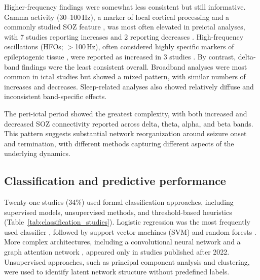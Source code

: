 \documentclass[12pt]{article}
\begin{document}
Higher-frequency findings were somewhat less consistent but still informative. Gamma activity (30--100\,Hz), a marker of local cortical processing and a commonly studied SOZ feature \cite{Grinenko2018-zk}, was most often elevated in preictal analyses, with 7 studies reporting increases \cite{Coelli2019-hu, Li2021-gq, Vila-Vidal2024-ha, Ivankovic2025-ng, Li2025-os, Xu2025-lh, He2025-tw} and 2 reporting decreases \cite{Van_Diessen2013-pr, Vila-Vidal2024-ha}. High-frequency oscillations (HFOs; $>$100\,Hz), often considered highly specific markers of epileptogenic tissue \cite{Jacobs2012-uo}, were reported as increased in 3 studies \cite{Li2021-gq, Mo2021-ig, Li2023-vy}. By contrast, delta-band findings were the least consistent overall. Broadband analyses were most common in ictal studies but showed a mixed pattern, with similar numbers of increases and decreases. Sleep-related analyses also showed relatively diffuse and inconsistent band-specific effects.

The peri-ictal period showed the greatest complexity, with both increased and decreased SOZ connectivity reported across delta, theta, alpha, and beta bands. This pattern suggests substantial network reorganization around seizure onset and termination, with different methods capturing different aspects of the underlying dynamics.

\subsection{Classification and predictive performance}

Twenty-one studies (34\%) used formal classification approaches, including supervised models, unsupervised methods, and threshold-based heuristics (Table~\ref{tab:classification_studies}). Logistic regression was the most frequently used classifier \cite{Goodale2020-lj, Narasimhan2020-af, Wang2023-ys, Ye2023-jm, Xu2023-rm, Conrad2024-uh}, followed by support vector machines (SVM) \cite{Klimes2019-ie, Weiss2022-xy, Wang2023-ys, Yin2024-ls, Ivankovic2025-ng} and random forests \cite{Jiang2022-uq, Xu2025-lh}. More complex architectures, including a convolutional neural network \cite{Doss2024-rs} and a graph attention network \cite{Wang2025-ij}, appeared only in studies published after 2022. Unsupervised approaches, such as principal component analysis and clustering, were used to identify latent network structure without predefined labels.
\end{document}
